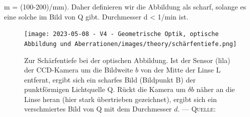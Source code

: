 \documentclass[../protokoll.tex]{subfiles}
\begin{document}
m = (100-200)/mm). Daher definieren wir die Abbildung als scharf, solange es eine solche im Bild von Q gibt.
Durchmesser d < 1/min ist.

\begin{figure}[H]
    \centering
    \texttt{[image: 2023-05-08 - V4 - Geometrische Optik, optische Abbildung und Aberrationen/images/theory/schärfentiefe.png]}
    \caption{Zur Schärfentiefe bei der optischen Abbildung. Ist der Sensor (lila) der CCD-Kamera um die Bildweite $b$ von der
Mitte der Linse L entfernt, ergibt sich ein scharfes Bild (Bildpunkt B) der punktförmigen Lichtquelle Q. Rückt die
Kamera um $\delta b$ näher an die Linse heran (hier stark übertrieben gezeichnet), ergibt sich ein verschmiertes Bild von Q
mit dem Durchmesser $d$. --- \textsc{Quelle}: \cite[S. 49, Abb. 8]{script}}
    \label{fig:schärfentiefe}
\end{figure}
\end{document}
